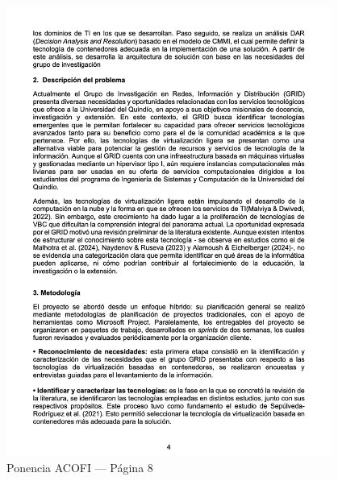 \begin{figure}[H]
	\centering
	\begin{tcolorbox}[
			colback=white,
			colframe=gray!50,
			boxrule=1pt,
			arc=2pt,
			boxsep=5pt,
			left=3pt,
			right=3pt,
			top=3pt,
			bottom=3pt,
			drop shadow
		]
		\includegraphics[width=0.95\textwidth,keepaspectratio]{apendices/ACOFI/pagina_8.png}
	\end{tcolorbox}
	\caption{Ponencia ACOFI --- Página 8}\label{fig:acofi-pagina-8}
\end{figure}
\FloatBarrier%
